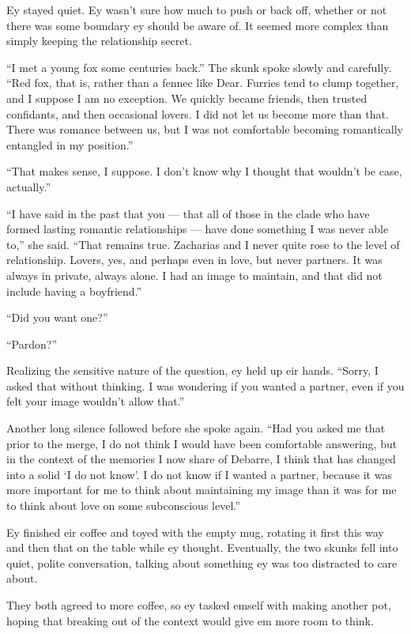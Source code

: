 Ey stayed quiet. Ey wasn't sure how much to push or back off, whether or not there was some boundary ey should be aware of. It seemed more complex than simply keeping the relationship secret.

``I met a young fox some centuries back.'' The skunk spoke slowly and carefully. ``Red fox, that is, rather than a fennec like Dear. Furries tend to clump together, and I suppose I am no exception. We quickly became friends, then trusted confidants, and then occasional lovers. I did not let us become more than that. There was romance between us, but I was not comfortable becoming romantically entangled in my position.''

``That makes sense, I suppose. I don't know why I thought that wouldn't be case, actually.''

``I have said in the past that you — that all of those in the clade who have formed lasting romantic relationships — have done something I was never able to,'' she said. ``That remains true. Zacharias and I never quite rose to the level of relationship. Lovers, yes, and perhaps even in love, but never partners. It was always in private, always alone. I had an image to maintain, and that did not include having a boyfriend.''

``Did you want one?''

``Pardon?''

Realizing the sensitive nature of the question, ey held up eir hands. ``Sorry, I asked that without thinking. I was wondering if you wanted a partner, even if you felt your image wouldn't allow that.''

Another long silence followed before she spoke again. ``Had you asked me that prior to the merge, I do not think I would have been comfortable answering, but in the context of the memories I now share of Debarre, I think that has changed into a solid `I do not know'. I do not know if I wanted a partner, because it was more important for me to think about maintaining my image than it was for me to think about love on some subconscious level.''

Ey finished eir coffee and toyed with the empty mug, rotating it first this way and then that on the table while ey thought. Eventually, the two skunks fell into quiet, polite conversation, talking about something ey was too distracted to care about.

They both agreed to more coffee, so ey tasked emself with making another pot, hoping that breaking out of the context would give em more room to think.

